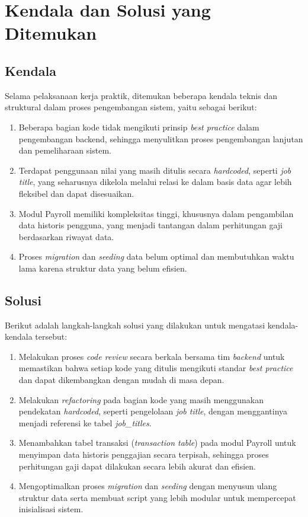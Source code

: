 \section{Kendala dan Solusi yang Ditemukan}

\subsection{Kendala}
Selama pelaksanaan kerja praktik, ditemukan beberapa kendala teknis dan struktural dalam proses pengembangan sistem, yaitu sebagai berikut:
\begin{enumerate}
\item Beberapa bagian kode tidak mengikuti prinsip \textit{best practice} dalam pengembangan backend, sehingga menyulitkan proses pengembangan lanjutan dan pemeliharaan sistem.
\item Terdapat penggunaan nilai yang masih ditulis secara \textit{hardcoded}, seperti \textit{job title}, yang seharusnya dikelola melalui relasi ke dalam basis data agar lebih fleksibel dan dapat disesuaikan.
\item Modul Payroll memiliki kompleksitas tinggi, khususnya dalam pengambilan data historis pengguna, yang menjadi tantangan dalam perhitungan gaji berdasarkan riwayat data.
\item Proses \textit{migration} dan \textit{seeding} data belum optimal dan membutuhkan waktu lama karena struktur data yang belum efisien.
\end{enumerate}

\subsection{Solusi}
Berikut adalah langkah-langkah solusi yang dilakukan untuk mengatasi kendala-kendala tersebut:
\begin{enumerate}
    \item Melakukan proses \textit{code review} secara berkala bersama tim \textit{backend} untuk memastikan bahwa setiap kode yang ditulis mengikuti standar \textit{best practice} dan dapat dikembangkan dengan mudah di masa depan.
    \item Melakukan \textit{refactoring} pada bagian kode yang masih menggunakan pendekatan \textit{hardcoded}, seperti pengelolaan \textit{job title}, dengan menggantinya menjadi referensi ke tabel \textit{job\_titles}.
    \item Menambahkan tabel transaksi (\textit{transaction table}) pada modul Payroll untuk menyimpan data historis penggajian secara terpisah, sehingga proses perhitungan gaji dapat dilakukan secara lebih akurat dan efisien.
    \item Mengoptimalkan proses \textit{migration} dan \textit{seeding} dengan menyusun ulang struktur data serta membuat script yang lebih modular untuk mempercepat inisialisasi sistem.
\end{enumerate}



